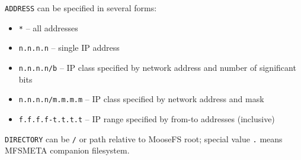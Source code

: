 \documentclass[a4paper,11pt,english]{report}
\def\code#1{\texttt{#1}}
\begin{document}
				\code{ADDRESS} can be specified in several forms:
					\begin{itemize}
						\item \code{*}				-- all addresses
						\item \code{n.n.n.n}			-- single IP address
						\item \code{n.n.n.n/b}		-- IP class specified by network address and number of significant bits
						\item \code{n.n.n.n/m.m.m.m}	-- IP class specified by network address and mask
						\item \code{f.f.f.f-t.t.t.t}	-- IP range specified by from-to addresses (inclusive)
					\end{itemize}
				
				\bigskip
				\code{DIRECTORY} can be \code{/} or path relative to MooseFS root;  special  value  \code{.} means MFSMETA companion filesystem.
				
\end{document}
